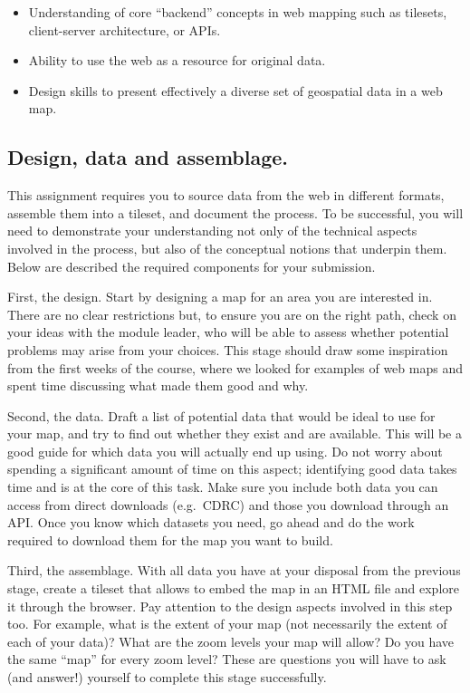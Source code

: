 \documentclass[
  letterpaper,
  DIV=11,
  numbers=noendperiod]{scrreprt}
\begin{document}
\begin{itemize}
\item
  Understanding of core ``backend'' concepts in web mapping such as
  tilesets, client-server architecture, or APIs.
\item
  Ability to use the web as a resource for original data.
\item
  Design skills to present effectively a diverse set of geospatial data
  in a web map.
\end{itemize}

\hypertarget{design-data-and-assemblage.}{%
\subsection*{Design, data and
assemblage.}\label{design-data-and-assemblage.}}

This assignment requires you to source data from the web in different
formats, assemble them into a tileset, and document the process. To be
successful, you will need to demonstrate your understanding not only of
the technical aspects involved in the process, but also of the
conceptual notions that underpin them. Below are described the required
components for your submission.

First, the design. Start by designing a map for an area you are
interested in. There are no clear restrictions but, to ensure you are on
the right path, check on your ideas with the module leader, who will be
able to assess whether potential problems may arise from your choices.
This stage should draw some inspiration from the first weeks of the
course, where we looked for examples of web maps and spent time
discussing what made them good and why.

Second, the data. Draft a list of potential data that would be ideal to
use for your map, and try to find out whether they exist and are
available. This will be a good guide for which data you will actually
end up using. Do not worry about spending a significant amount of time
on this aspect; identifying good data takes time and is at the core of
this task. Make sure you include both data you can access from direct
downloads (e.g.~CDRC) and those you download through an API. Once you
know which datasets you need, go ahead and do the work required to
download them for the map you want to build.

Third, the assemblage. With all data you have at your disposal from the
previous stage, create a tileset that allows to embed the map in an HTML
file and explore it through the browser. Pay attention to the design
aspects involved in this step too. For example, what is the extent of
your map (not necessarily the extent of each of your data)? What are the
zoom levels your map will allow? Do you have the same ``map'' for every
zoom level? These are questions you will have to ask (and answer!)
yourself to complete this stage successfully.
\end{document}
